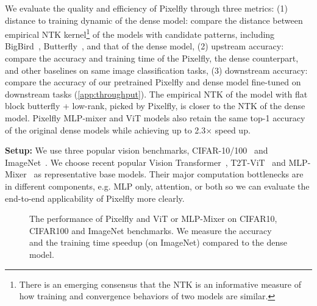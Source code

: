 We evaluate the quality and efficiency of Pixelfly through three metrics: (1) distance to training dynamic of the dense model: compare the distance between empirical NTK kernel\footnote{There is an emerging consensus that the NTK is an informative measure of how training and convergence behaviors of two models are similar.} of the models with candidate patterns, including BigBird~\citep{zaheer2020bigbird}, Butterfly~\citep{dao2020kaleidoscope}, and that of the dense model, (2) upstream accuracy: compare the accuracy and training time of the Pixelfly, the dense counterpart, and other baselines on same image classification tasks, (3) downstream accuracy: compare the accuracy of our pretrained Pixelfly and dense model fine-tuned on downstream tasks (\cref{app:throughput}). The empirical NTK of the model with flat block butterfly + low-rank, picked by Pixelfly, is closer to the NTK of the dense model. Pixelfly MLP-mixer and ViT models also retain the same top-1 accuracy of the original dense models while achieving up to 2.3$\times$ speed up.




\textbf{Setup:} We use three popular vision benchmarks, CIFAR-10/100~\citep{krizhevsky2009learning} and ImageNet~\citep{deng2009imagenet}. We choose recent popular Vision Transformer~\citep{dosovitskiy2020image}, T2T-ViT~\citep{yuan2021tokens} and MLP-Mixer~\citep{tolstikhin2021mlp} as representative base models. Their major computation bottlenecks are in different components, e.g. MLP only, attention, or both so we can evaluate the end-to-end applicability of Pixelfly more clearly.

\begin{wrapfigure}{}{0.67\textwidth}
    \vspace{-0.4cm}
\captionsetup{font=small}
    \caption{The performance of Pixelfly and ViT or MLP-Mixer on CIFAR10, CIFAR100 and ImageNet benchmarks. We measure the accuracy and the training time speedup (on ImageNet) compared to the dense model.\vspace{-0.3cm}}
\centering
{}
    \vspace{-0.2cm}
\label{table:imagenet}
\end{wrapfigure}

